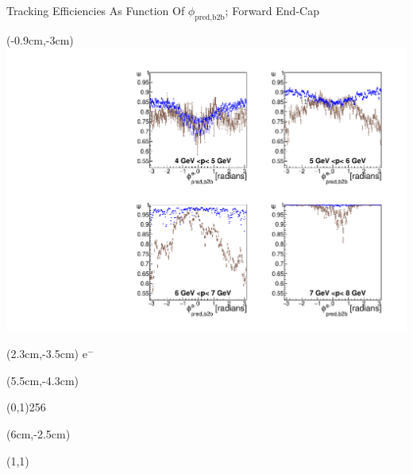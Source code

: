 \documentclass[8pt]{beamer}
\begin{document}
\begin{frame}{Tracking Efficiencies As Function Of $\phi_{\textrm{pred,b2b}}$; Forward End-Cap}
	
	
	\begin{textblock*}{6.5cm}(-0.9cm,-3cm)
		\includegraphics[width=\textwidth]{VPlots/Comp/cMPhiemFC_Data}
	\end{textblock*}
	
	\begin{textblock*}{2cm}(2.3cm,-3.5cm)
		$\textrm{e}^-$
	\end{textblock*}
	
	
	
	\begin{textblock*}{11cm}(5.5cm,-4.3cm)
		
		\begin{center}
			\line(0,1){256}
		\end{center}
		
	\end{textblock*}
	
	
	\begin{textblock*}{6.5cm}(6cm,-2.5cm)
		
		\setlength{\unitlength}{5cm}
		\begin{picture}(1,1)
		
		\end{picture}
		
	\end{textblock*}
	
	
	

\end{frame}
\end{document}

